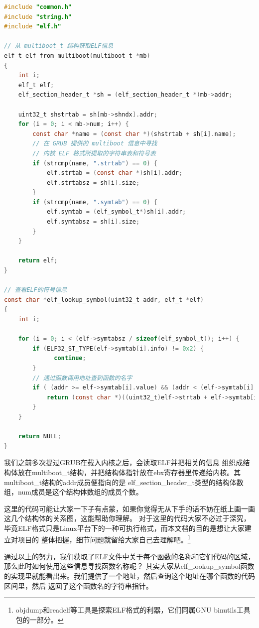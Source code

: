 \begin{lstlisting}[language = C, label = kernel/debug/elf.c, caption = kernel/debug/elf.c]
#include "common.h"
#include "string.h"
#include "elf.h"

// 从 multiboot_t 结构获取ELF信息
elf_t elf_from_multiboot(multiboot_t *mb)
{
	int i;
	elf_t elf;
	elf_section_header_t *sh = (elf_section_header_t *)mb->addr;

	uint32_t shstrtab = sh[mb->shndx].addr;
	for (i = 0; i < mb->num; i++) {
		const char *name = (const char *)(shstrtab + sh[i].name);
		// 在 GRUB 提供的 multiboot 信息中寻找
		// 内核 ELF 格式所提取的字符串表和符号表
		if (strcmp(name, ".strtab") == 0) {
			elf.strtab = (const char *)sh[i].addr;
			elf.strtabsz = sh[i].size;
		}
		if (strcmp(name, ".symtab") == 0) {
			elf.symtab = (elf_symbol_t*)sh[i].addr;
			elf.symtabsz = sh[i].size;
		}
	}

	return elf;
}

// 查看ELF的符号信息
const char *elf_lookup_symbol(uint32_t addr, elf_t *elf)
{
	int i;

	for (i = 0; i < (elf->symtabsz / sizeof(elf_symbol_t)); i++) {
		if (ELF32_ST_TYPE(elf->symtab[i].info) != 0x2) {
		      continue;
		}
		// 通过函数调用地址查到函数的名字
		if ( (addr >= elf->symtab[i].value) && (addr < (elf->symtab[i].value + elf->symtab[i].size)) ) {
			return (const char *)((uint32_t)elf->strtab + elf->symtab[i].name);
		}
	}

	return NULL;
}
\end{lstlisting}

\par 我们之前多次提过GRUB在载入内核之后，会读取ELF并把相关的信息\allowbreak
组织成结构体放在multiboot\_t结构，并把结构体指针放在ebx寄存器里传递给内核。其multiboot\_t结构的addr成员便指向的是\allowbreak
elf\_section\_header\_t类型的结构体数组，num成员是这个结构体数组的成员个数。

\par 这里的代码可能让大家一下子有点蒙，如果你觉得无从下手的话不妨在纸上画一画这几个结构体的关系图，这能帮助你理解。\allowbreak
对于这里的代码大家不必过于深究，毕竟ELF格式只是Linux平台下的一种可执行格式，而本文档的目的是想让大家建立对项目的\allowbreak
整体把握，细节问题就留给大家自己去理解吧。\footnote{objdump和readelf等工具是探索ELF格式的利器，它们同属GNU binutils工具包的一部分。}

\par 通过以上的努力，我们获取了ELF文件中关于每个函数的名称和它们代码的区域，那么此时如何使用这些信息寻找函数名称呢？\allowbreak
其实大家从elf\_lookup\_symbol函数的实现里就能看出来。我们提供了一个地址，然后查询这个地址在哪个函数的代码区间里，然后\allowbreak
返回了这个函数名的字符串指针。

